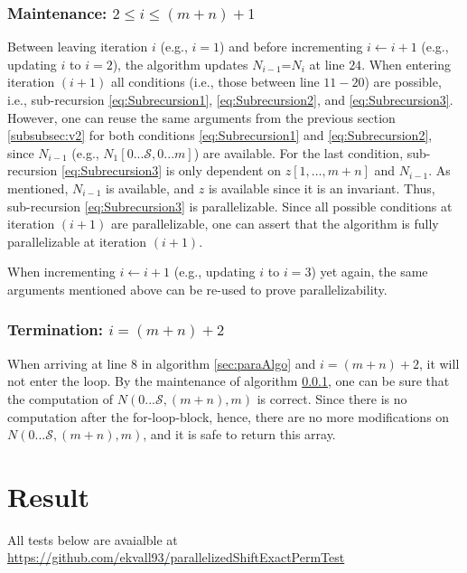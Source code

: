 \documentclass[a4paper]{article}
\begin{document}
\subsubsection{Maintenance: $2\leq i \leq (m+n)+1$}
\label{subsubsec:maintenance}
Between leaving iteration $i$ (e.g., $i=1$) and before incrementing $i\leftarrow i+1$ (e.g., updating $i$ to $i=2$), the algorithm updates $N_{i-1}$=$N_{i}$ at line $24$. When entering iteration $(i+1)$ all conditions (i.e., those between line $11-20$) are possible, i.e., sub-recursion \ref{eq:Subrecursion1}, \ref{eq:Subrecursion2}, and \ref{eq:Subrecursion3}. However, one can reuse the same arguments from the previous section \ref{subsubsec:v2} for both conditions \ref{eq:Subrecursion1} and \ref{eq:Subrecursion2}, since $N_{i-1}$ (e.g., $N_{1}[0...\mathcal{S},0...m]$) are available. For the last condition, sub-recursion \ref{eq:Subrecursion3} is only dependent on $z[1,\ldots,m+n]$ and $N_{i-1}$. As mentioned, $N_{i-1}$ is available, and $z$ is available since it is an invariant. Thus, sub-recursion \ref{eq:Subrecursion3} is parallelizable. Since all possible conditions at iteration $(i+1)$ are parallelizable, one can assert that the algorithm is fully parallelizable at iteration $(i+1)$.

When incrementing $i\leftarrow i+1$ (e.g., updating $i$ to $i=3$) yet again, the same arguments mentioned above can be re-used to prove parallelizability.

\subsubsection{Termination: $i=(m+n)+2$}
When arriving at line $8$ in algorithm \ref{sec:paraAlgo} and $i=(m+n)+2$, it will not enter the loop. By the maintenance of algorithm \ref{subsubsec:maintenance}, one can be sure that the computation of $N(0...\mathcal{S},(m+n),m)$ is correct. Since there is no computation after the for-loop-block, hence, there are no more modifications on $N(0...\mathcal{S},(m+n),m)$, and it is safe to return this array. 



\section{Result}
\label{sec:result}
All tests below are avaialble at \href{https://github.com/ekvall93/parallelizedShiftExactPermTest}{https://github.com/ekvall93/parallelizedShiftExactPermTest}
\end{document}
